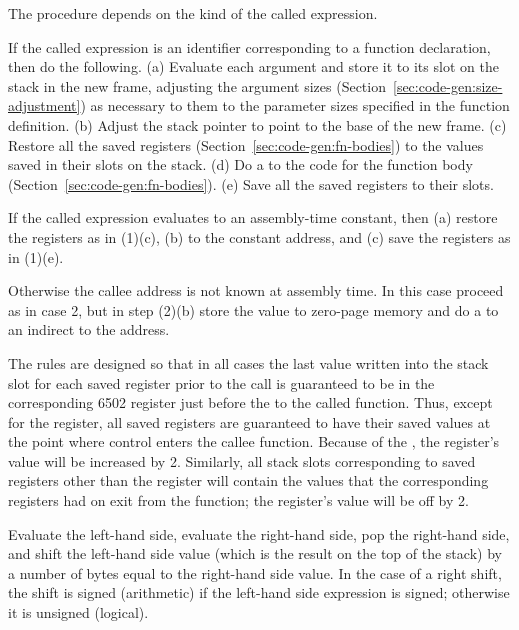 \documentclass[10pt]{article}
\begin{document}
 The procedure depends on the kind of the
called expression.

 If the called expression is an
identifier corresponding to a function declaration, then do the
following.  (a) Evaluate each argument and store it to its slot on the
stack in the new frame, adjusting the argument sizes
(Section~\ref{sec:code-gen:size-adjustment}) as necessary to them to
the parameter sizes specified in the function definition. (b) Adjust
the stack pointer to point to the base of the new frame.  (c) Restore
all the saved registers (Section~\ref{sec:code-gen:fn-bodies}) to the
values saved in their slots on the stack.  (d) Do a  to the
code for the function body (Section~\ref{sec:code-gen:fn-bodies}). (e)
Save all the saved registers to their slots.

 If the called expression
evaluates to an assembly-time constant, then (a) restore the registers
as in (1)(c), (b)  to the constant address, and (c) save the
registers as in (1)(e).

 Otherwise the callee address is
not known at assembly time.  In this case proceed as in case 2, but in
step (2)(b) store the value to zero-page memory and do a  to
an indirect  to the address.

The rules are designed so that in all cases the last value written
into the stack slot for each saved register prior to the call is
guaranteed to be in the corresponding 6502 register just before the
 to the called function.  Thus, except for the 
register, all saved registers are guaranteed to have their saved
values at the point where control enters the callee function.  Because
of the , the  register's value will be increased by 2.
Similarly, all stack slots corresponding to saved registers other than
the  register will contain the values that the corresponding
registers had on exit from the function; the  register's value
will be off by 2.

%
 Evaluate the left-hand side,
evaluate the right-hand side, pop the right-hand side, and shift the
left-hand side value (which is the result on the top of the stack) by
a number of bytes equal to the right-hand side value.  In the case of
a right shift, the shift is signed (arithmetic) if the left-hand side
expression is signed; otherwise it is unsigned (logical).
\end{document}
